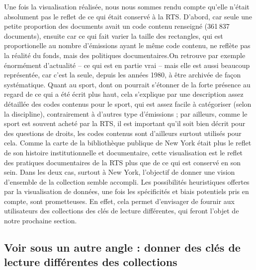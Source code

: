 Une fois la visualisation réalisée, nous nous sommes rendu compte qu’elle n’était absolument pas le reflet de ce qui était conservé à la RTS. D’abord, car seule une petite proportion des documents avait un code contenu renseigné (361 837 documents), ensuite car ce qui fait varier la taille des rectangles, qui est proportionelle au nombre d'émissions ayant le même code contenu, ne reflète pas la réalité du fonds, mais des politiques documentaires.On retrouve par exemple énormément d’actualité -- ce qui est en partie vrai -- mais elle est aussi beaucoup représentée, car c’est la seule, depuis les années 1980, à être archivée de façon systématique. Quant au sport, dont on pourrait s'étonner de la forte présence au regard de ce qui a été écrit plus haut, cela s'explique par une description assez détaillée des codes contenus pour le sport, qui est assez facile à catégoriser (selon la discipline), contrairement à d'autres type d'émissions ; par ailleurs, comme le sport est souvent acheté par la RTS, il est important qu'il soit bien décrit pour des questions de droits, les codes contenus sont d'ailleurs surtout utilisés pour cela. Comme la carte de la bibliothèque publique de New York était plus le reflet de son histoire institutionnelle et documentaire, cette visualisation est le reflet des pratiques documentaires de la RTS plus que de ce qui est conservé en son sein. Dans les deux cas, surtout à New York, l'objectif de donner une vision d'ensemble de la collection semble accompli. Les possibilités heuristiques offertes par la visualisation de données, une fois les spécificités et biais potentiels pris en compte, sont prometteuses. En effet, cela permet d'envisager de fournir aux utilisateurs des collections des clés de lecture différentes, qui feront l'objet de notre prochaine section.

\subsection{Voir sous un autre angle : donner des clés de lecture différentes des collections}


